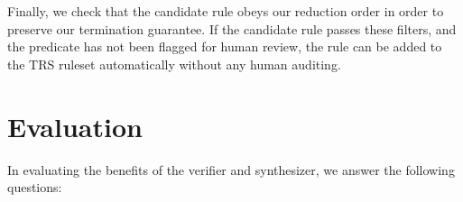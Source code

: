 \documentclass[acmsmall,review]{acmart}\settopmatter{printfolios=true,printccs=false,printacmref=false}
\begin{document}
Finally, we
check that the candidate rule obeys our reduction order in order to
preserve our termination guarantee. If the candidate rule passes these
filters, and the predicate has not been flagged for human review, the
rule can be added to the TRS ruleset automatically without any human
auditing.

\section{Evaluation}
\label{sec:evaluation}

\newcommand{\PercentPossibleToSynth}{69\%}
\newcommand{\NumRulesInCorrectnessExperiment}{321}
\newcommand{\PercentRulesResynthesized}{58\%}

In evaluating the benefits of the verifier and synthesizer, we answer the following questions:
\end{document}
